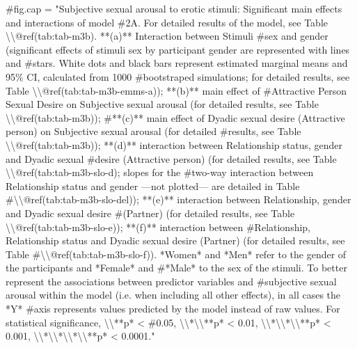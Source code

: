 \documentclass[
  bookmarksnumbered]{article}
\newenvironment{Shaded}{\begin{snugshade}}{\end{snugshade}}
\newcommand{\CommentTok}[1]{\textcolor[rgb]{0.50,0.62,0.50}{#1}}
\begin{document}
\begin{Shaded}
\begin{Highlighting}[]
\CommentTok{\#fig.cap = "Subjective sexual arousal to erotic stimuli: Significant main effects and interactions of model \#2A. For detailed results of the model, see Table \textbackslash{}\textbackslash{}@ref(tab:tab{-}m3b). **(a)** Interaction between Stimuli \#sex and gender (significant effects of stimuli sex by participant gender are represented with lines and \#stars. White dots and black bars represent estimated marginal means and 95\% CI, calculated from 1000 \#bootstraped simulations; for detailed results, see Table \textbackslash{}\textbackslash{}@ref(tab:tab{-}m3b{-}emms{-}a)); **(b)** main effect of \#Attractive Person Sexual Desire on Subjective sexual arousal (for detailed results, see Table \textbackslash{}\textbackslash{}@ref(tab:tab{-}m3b)); \#**(c)** main effect of Dyadic sexual desire (Attractive person) on Subjective sexual arousal  (for detailed \#results, see Table \textbackslash{}\textbackslash{}@ref(tab:tab{-}m3b)); **(d)** interaction between Relationship status, gender and Dyadic sexual \#desire (Attractive person) (for detailed results, see Table \textbackslash{}\textbackslash{}@ref(tab:tab{-}m3b{-}slo{-}d); slopes for the \#two{-}way interaction between Relationship status and gender —not plotted— are detailed in Table \#\textbackslash{}\textbackslash{}@ref(tab:tab{-}m3b{-}slo{-}del)); **(e)** interaction between Relationship, gender and Dyadic sexual desire \#(Partner) (for detailed results, see Table \textbackslash{}\textbackslash{}@ref(tab:tab{-}m3b{-}slo{-}e)); **(f)** interaction between \#Relationship, Relationship status and Dyadic sexual desire (Partner) (for detailed results, see Table \#\textbackslash{}\textbackslash{}@ref(tab:tab{-}m3b{-}slo{-}f)). *Women* and *Men* refer to the gender of the participants and *Female* and \#*Male* to the sex of the stimuli. To better represent the associations between predictor variables and \#subjective sexual arousal within the model (i.e. when including all other effects), in all cases the *Y* \#axis represents values predicted by the model instead of raw values. For statistical significance, \textbackslash{}\textbackslash{}**p* \textless{} \#0.05, \textbackslash{}\textbackslash{}*\textbackslash{}\textbackslash{}**p* \textless{} 0.01, \textbackslash{}\textbackslash{}*\textbackslash{}\textbackslash{}*\textbackslash{}\textbackslash{}**p* \textless{} 0.001, \textbackslash{}\textbackslash{}*\textbackslash{}\textbackslash{}*\textbackslash{}\textbackslash{}*\textbackslash{}\textbackslash{}**p* \textless{} 0.0001."}



\end{Highlighting}
\end{Shaded}
\end{document}
